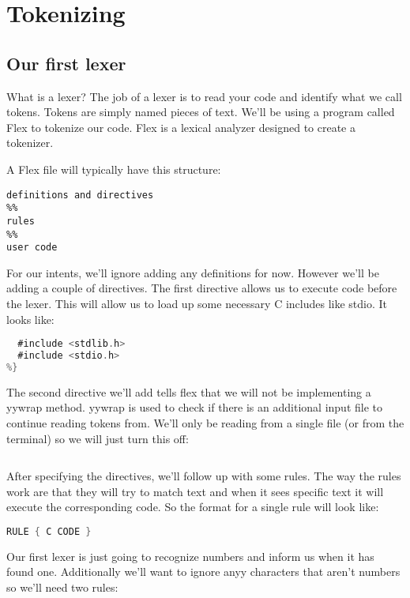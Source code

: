 \chapter{Tokenizing}

\section{Our first lexer}

What is a lexer? The job of a lexer is to read your code and identify what we call tokens. Tokens are simply named pieces of text. We'll be using a program called Flex to tokenize our code. Flex is a lexical analyzer designed to create a tokenizer.

A Flex file will typically have this structure:

\begin{lstlisting}
definitions and directives
%%
rules
%%
user code
\end{lstlisting}

For our intents, we'll ignore adding any definitions for now. However we'll be adding a couple of directives. The first directive allows us to execute code before the lexer. This will allow us to load up some necessary C includes like stdio. It looks like:

\begin{lstlisting}[language=C]
%{
  #include <stdlib.h>
  #include <stdio.h>
%}
\end{lstlisting}

The second directive we'll add tells flex that we will not be implementing a yywrap method. yywrap is used to check if there is an additional input file to continue reading tokens from. We'll only be reading from a single file (or from the terminal) so we will just turn this off:

\begin{lstlisting}[language=C]
%option noyywrap
\end{lstlisting}

After specifying the directives, we'll follow up with some rules. The way the rules work are that they will try to match text and when it sees specific text it will execute the corresponding code. So the format for a single rule will look like:

\begin{lstlisting}[language=C]
RULE { C CODE }
\end{lstlisting}

Our first lexer is just going to recognize numbers and inform us when it has found one. Additionally we'll want to ignore anyy characters that aren't numbers so we'll need two rules:

